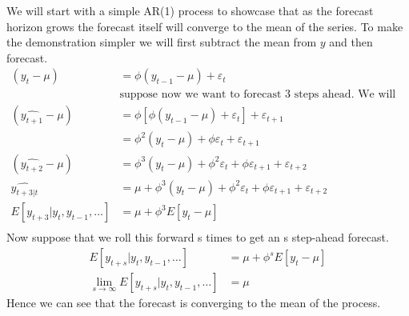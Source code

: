 \documentclass[12pt,letter]{article}
\begin{document}
We will start with a simple AR(1) process to showcase that as the forecast horizon grows the forecast itself will converge to the mean of the series. To make the demonstration simpler we will first subtract the mean from $y$ and then forecast.
\begin{align*}
(y_t-\mu) &= \phi(y_{t-1}-\mu) + \varepsilon_t\\
&\text{suppose now we want to forecast 3 steps ahead. We will iterate our equation forward}\\
(\hat{y_{t+1}}-\mu) &= \phi \left[ \phi(y_{t-1}-\mu) + \varepsilon_t\right] +\varepsilon_{t+1}\\
&=\phi^2 (y_t-\mu) +\phi \varepsilon_t +\varepsilon_{t+1}\\
(\hat{y_{t+2}}-\mu) &= \phi^3(y_t-\mu) + \phi^2 \varepsilon_t + \phi \varepsilon_{t+1} + \varepsilon_{t+2}\\
\hat{y_{t+3|t}} &= \mu + \phi^3(y_t-\mu) + \phi^2 \varepsilon_t + \phi \varepsilon_{t+1} + \varepsilon_{t+2}\\
E\left[y_{t+3}|y_t, y_{t-1}, \dots\right] & = \mu+ \phi^3 E[y_t- \mu]\\
\end{align*}
Now suppose that we roll this forward s times to get an s step-ahead forecast.
\begin{align*}
E\left[y_{t+s}|y_t, y_{t-1}, \dots\right] & = \mu+ \phi^s E[y_t- \mu]\\
\lim_{s\rightarrow \infty} E\left[y_{t+s}|y_t, y_{t-1}, \dots\right] & = \mu
\end{align*}
Hence we can see that the forecast is converging to the mean of the process.
\end{document}
